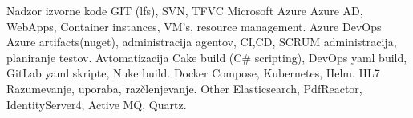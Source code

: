 
\begin{cvskills}
  
\cvskill
{Nadzor izvorne kode} %
{GIT (lfs), SVN, TFVC} %
\cvskill
{Microsoft Azure} %
{Azure AD, WebApps, Container instances, VM's, resource management.} %
\cvskill
{Azure DevOps} %
{Azure artifacts(nuget), administracija agentov, CI,\newline CD, SCRUM administracija, planiranje testov.} %
\cvskill
{Avtomatizacija} %
{Cake build (C\# scripting), DevOps yaml build, GitLab yaml skripte, Nuke build.} %
\cvskill
{Docker} %
{Compose, Kubernetes, Helm.} %
\cvskill
{HL7} %
{Razumevanje, uporaba, razčlenjevanje.} %
\cvskill
{Other} %
{Elasticsearch, PdfReactor, IdentityServer4, Active MQ, Quartz.} %

\end{cvskills}